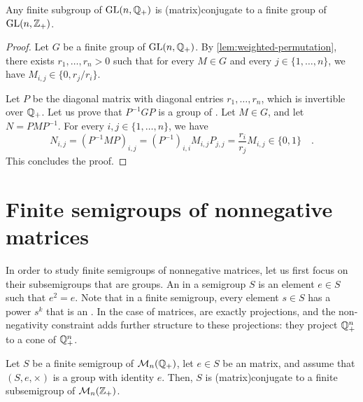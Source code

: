 \begin{theorem}
  \label{thm:group-nonnegative}
  Any finite subgroup of $\GL[n]{\Rat_+}$ is \kl(matrix){conjugate} to a finite group of
  $\GL[n]{\Int_+}$.
\end{theorem}
\begin{proof}
  Let $G$ be a finite group of $\GL[n]{\Rat_+}$.
  By \cref{lem:weighted-permutation}, there exists $r_1, \ldots, r_n > 0$ such that
  for every $M \in G$ and every $j \in \{1,
  \ldots, n\}$, we have $M_{i,j} \in \{0, r_j/r_i\}$.

  Let $P$ be the diagonal matrix with diagonal entries $r_1, \ldots, r_n$,
  which is invertible over $\Rat_+$.
  Let us prove that $P^{-1} G P$ is a group of .
  Let $M \in G$, and let $N = P M P^{-1}$.
  For every $i, j \in \{1, \ldots, n\}$, we have
  \begin{equation}
    N_{i,j} = (P^{-1} M P)_{i,j}
    = (P^{-1})_{i,i} M_{i,j} P_{j,j}
    = \frac{r_i}{r_j} M_{i,j} \in \{0, 1\}
    \quad .
  \end{equation}  
  This concludes the proof.
\end{proof}

\section{Finite semigroups of nonnegative matrices}

\AP In order to study finite semigroups of nonnegative matrices, let us first
focus on their subsemigroups that are groups. An  in a
semigroup $S$ is an element $e \in S$ such that $e^2 = e$. Note that in a
finite semigroup, every element $s \in S$ has a power $s^k$ that is an
. In the case of matrices,  are exactly
projections, and the non-negativity constraint adds further structure to these
projections: they project $\Rat_+^n$ to a cone of $\Rat_+^n$.

\begin{conjecture}
  \label{conj:subgroup-nonnegative}
  Let $S$ be a finite semigroup of $\Mat[n]{\Rat_+}$, 
  let $e \in S$ be an  matrix, and assume that 
  $(S, e, \times)$ is a group with identity $e$. Then, $S$ is
  \kl(matrix){conjugate} to a finite subsemigroup 
  of $\Mat[n]{\Int_+}$.
\end{conjecture}

